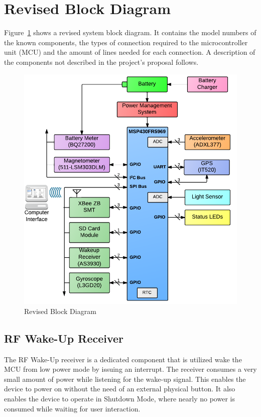 \section{Revised Block Diagram}

Figure~\ref{fig:blockDiagram} shows a revised system block diagram.  It contains the model numbers of the known components, the types of connection required to the microcontroller unit (MCU) and the amount of lines needed for each connection.  A description of the components not described in the project's proposal follows.

\begin{figure}[H]
	\centering
	\includegraphics[width=\textwidth]{img/blockDiagramV2_2}
	\caption{Revised Block Diagram \label{fig:blockDiagram}}
\end{figure}

\subsection{RF Wake-Up Receiver}
The RF Wake-Up receiver is a dedicated component that is utilized wake the MCU from low power mode by issuing an interrupt. The receiver consumes a very small amount of power while listening for the wake-up signal. This enables the device to power on without the need of an external physical button. It also enables the device to operate in Shutdown Mode, where nearly no power is consumed while waiting for user interaction.

